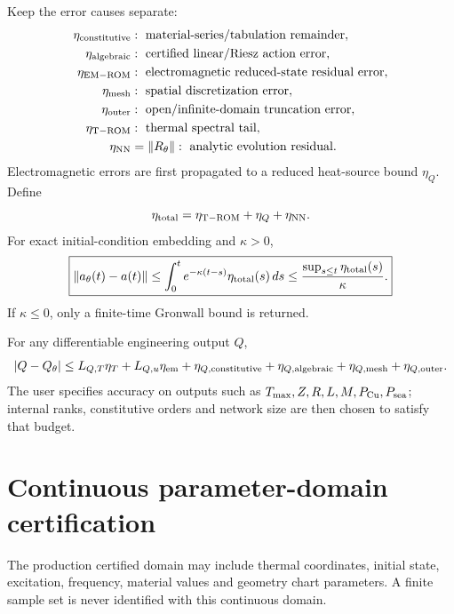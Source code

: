 \documentclass[11pt]{article}
\theoremstyle{remark}
\newcommand{\norm}[1]{\left\lVert #1\right\rVert}
\begin{document}
Keep the error causes separate:
\begin{align*}
\eta_{\rm constitutive}&:\ \text{material-series/tabulation remainder},\\
\eta_{\rm algebraic}&:\ \text{certified linear/Riesz action error},\\
\eta_{\rm EM-ROM}&:\ \text{electromagnetic reduced-state residual error},\\
\eta_{\rm mesh}&:\ \text{spatial discretization error},\\
\eta_{\rm outer}&:\ \text{open/infinite-domain truncation error},\\
\eta_{\rm T-ROM}&:\ \text{thermal spectral tail},\\
\eta_{\rm NN}&=\norm{R_\theta}:\ \text{analytic evolution residual}.
\end{align*}
Electromagnetic errors are first propagated to a reduced heat-source bound \(\eta_Q\). Define
\[
\eta_{\rm total}=\eta_{\rm T-ROM}+\eta_Q+\eta_{\rm NN}.
\]
For exact initial-condition embedding and \(\kappa>0\),
\begin{equation}
\boxed{
\norm{a_\theta(t)-a(t)}
\le\int_0^te^{-\kappa(t-s)}\eta_{\rm total}(s)\,ds
\le\frac{\sup_{s\le t}\eta_{\rm total}(s)}{\kappa}.
}
\label{eq:uniform_error}
\end{equation}
If \(\kappa\le0\), only a finite-time Gronwall bound is returned.

For any differentiable engineering output \(Q\),
\[
|Q-Q_\theta|
\le L_{Q,T}\eta_T+L_{Q,u}\eta_{\rm em}
+\eta_{Q,{\rm constitutive}}+\eta_{Q,{\rm algebraic}}
+\eta_{Q,{\rm mesh}}+\eta_{Q,{\rm outer}}.
\]
The user specifies accuracy on outputs such as \(T_{\max},Z,R,L,M,P_{\rm Cu},P_{\rm sea}\); internal ranks, constitutive orders and network size are then chosen to satisfy that budget.

\section{Continuous parameter-domain certification}

The production certified domain may include thermal coordinates, initial state, excitation, frequency, material values and geometry chart parameters. A finite sample set is never identified with this continuous domain.
\end{document}
